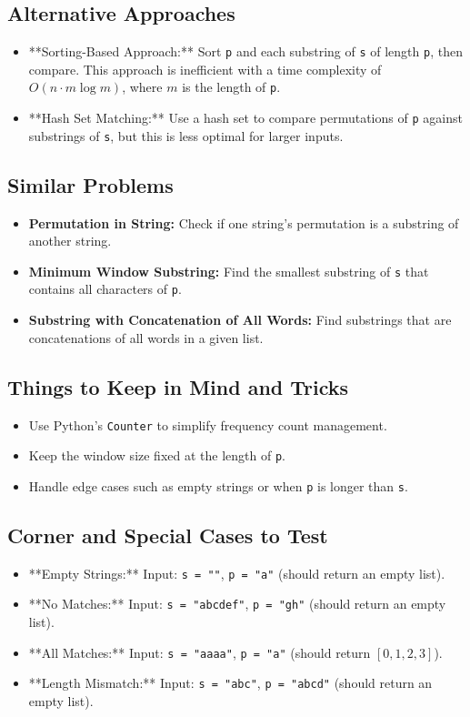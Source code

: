 \subsection*{Alternative Approaches}
\begin{itemize}
    \item **Sorting-Based Approach:**  
    Sort \texttt{p} and each substring of \texttt{s} of length \texttt{p}, then compare. This approach is inefficient with a time complexity of \(O(n \cdot m \log m)\), where \(m\) is the length of \texttt{p}.
    \item **Hash Set Matching:**  
    Use a hash set to compare permutations of \texttt{p} against substrings of \texttt{s}, but this is less optimal for larger inputs.
\end{itemize}

\subsection*{Similar Problems}
\begin{itemize}
    \item \textbf{Permutation in String:} Check if one string's permutation is a substring of another string.
    \item \textbf{Minimum Window Substring:} Find the smallest substring of \texttt{s} that contains all characters of \texttt{p}.
    \item \textbf{Substring with Concatenation of All Words:} Find substrings that are concatenations of all words in a given list.
\end{itemize}

\subsection*{Things to Keep in Mind and Tricks}
\begin{itemize}
    \item Use Python's \texttt{Counter} to simplify frequency count management.
    \item Keep the window size fixed at the length of \texttt{p}.
    \item Handle edge cases such as empty strings or when \texttt{p} is longer than \texttt{s}.
\end{itemize}

\subsection*{Corner and Special Cases to Test}
\begin{itemize}
    \item **Empty Strings:** Input: \texttt{s = ""}, \texttt{p = "a"} (should return an empty list).
    \item **No Matches:** Input: \texttt{s = "abcdef"}, \texttt{p = "gh"} (should return an empty list).
    \item **All Matches:** Input: \texttt{s = "aaaa"}, \texttt{p = "a"} (should return \([0, 1, 2, 3]\)).
    \item **Length Mismatch:** Input: \texttt{s = "abc"}, \texttt{p = "abcd"} (should return an empty list).
\end{itemize}

